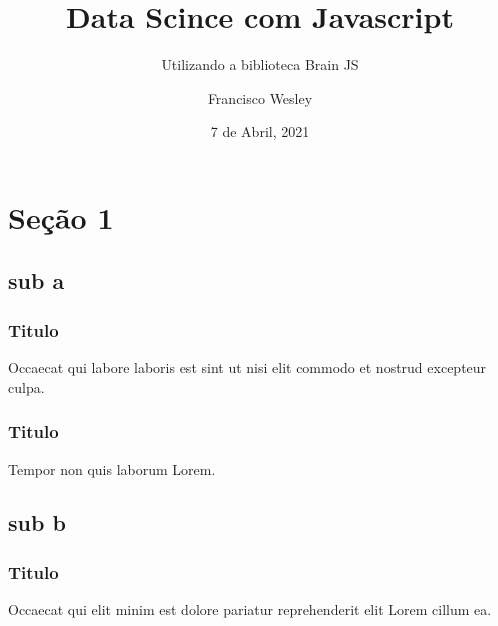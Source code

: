 \documentclass{beamer}
\title{Data Scince com Javascript}
\subtitle{Utilizando a biblioteca Brain JS}
\author{Francisco Wesley}
\institute[UFC]{Universidade Federal do Ceará}
\date{7 de Abril, 2021}
\begin{document}
    
    \begin{frame}
        \titlepage
    \end{frame}

    \begin{frame}
        \tableofcontents
    \end{frame}

    \section{Seção 1}
    \subsection{sub a}

    \begin{frame}
        \frametitle{Titulo}    
        Occaecat qui labore laboris est sint ut nisi elit commodo et nostrud excepteur culpa.
    \end{frame}
    
    \begin{frame}
        \frametitle{Titulo}
        Tempor non quis laborum Lorem.
    \end{frame}
    
    \subsection{sub b}

    \begin{frame}   
        \frametitle{Titulo}
        Occaecat qui elit minim est dolore pariatur reprehenderit elit Lorem cillum ea.         
    \end{frame} 
\end{document}

